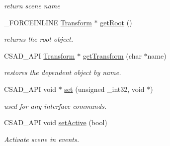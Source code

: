 \begin{DoxyCompactItemize}
\begin{DoxyCompactList}\small\item\em return scene name \end{DoxyCompactList}\item 
\hypertarget{classcsad_1_1_scene_a3986aa8cd7601b486511a50d412b7499}{\-\_\-\-F\-O\-R\-C\-E\-I\-N\-L\-I\-N\-E \hyperlink{classcsad_1_1_transform}{Transform} $\ast$ \hyperlink{classcsad_1_1_scene_a3986aa8cd7601b486511a50d412b7499}{get\-Root} ()}\label{classcsad_1_1_scene_a3986aa8cd7601b486511a50d412b7499}

\begin{DoxyCompactList}\small\item\em returns the root object. \end{DoxyCompactList}\item 
\hypertarget{classcsad_1_1_scene_a369a702aaa81d4456d065fed75dc10a1}{C\-S\-A\-D\-\_\-\-A\-P\-I \hyperlink{classcsad_1_1_transform}{Transform} $\ast$ \hyperlink{classcsad_1_1_scene_a369a702aaa81d4456d065fed75dc10a1}{get\-Transform} (char $\ast$name)}\label{classcsad_1_1_scene_a369a702aaa81d4456d065fed75dc10a1}

\begin{DoxyCompactList}\small\item\em restores the dependent object by name. \end{DoxyCompactList}\item 
\hypertarget{classcsad_1_1_scene_a400941902309674ff39dcf495555f7a6}{C\-S\-A\-D\-\_\-\-A\-P\-I void $\ast$ \hyperlink{classcsad_1_1_scene_a400941902309674ff39dcf495555f7a6}{set} (unsigned \-\_\-int32, void $\ast$)}\label{classcsad_1_1_scene_a400941902309674ff39dcf495555f7a6}

\begin{DoxyCompactList}\small\item\em used for any interface commands. \end{DoxyCompactList}\item 
\hypertarget{classcsad_1_1_scene_af7b981c31cdb952850600a7e08a9d643}{C\-S\-A\-D\-\_\-\-A\-P\-I void \hyperlink{classcsad_1_1_scene_af7b981c31cdb952850600a7e08a9d643}{set\-Active} (bool)}\label{classcsad_1_1_scene_af7b981c31cdb952850600a7e08a9d643}

\begin{DoxyCompactList}\small\item\em Activate scene in events. \end{DoxyCompactList}\end{DoxyCompactItemize}
